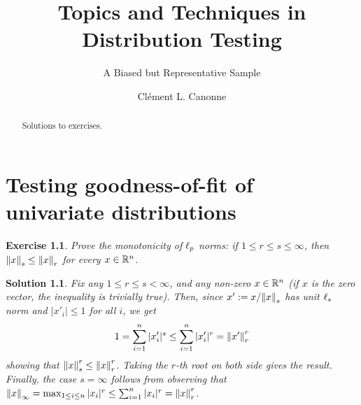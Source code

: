 \documentclass[biber]{nowfnt} %
\title{Topics and Techniques in Distribution Testing}
\subtitle{A Biased but Representative Sample}
\author[1]{Cl\'ement L. Canonne}
\affil[1]{University of Sydney; clement.canonne@sydney.edu.au}
\newtheorem{question}{Exercise}[chapter]
\newtheorem{solution}{Solution}[chapter]
\begin{document}
\makeabstracttitle
\begin{abstract}
Solutions to exercises.
\end{abstract}

\setcounter{chapter}{1}
\chapter{Testing goodness-of-fit of univariate distributions}
  \label{chap:identity}
  
  
 \begin{question}\label{ex:identity:monotonicity:lp}
  Prove the monotonicity of $\lp[p]$ norms: if $1\leq r\leq s \leq \infty$, then $\norm{x}_s \leq \norm{x}_r$ for every $x\in \R^n$.
\end{question}
\begin{solution}
Fix any $1\leq r\leq s < \infty$, and any non-zero $x\in\R^n$ (if $x$ is the zero vector, the inequality is trivially true). Then, since $x' \eqdef x/\norm{x}_s$ has unit $\lp[s]$ norm and $|x'_i| \leq 1$ for all $i$, we get
\[
	1 = \sum_{i=1}^n |x'_i|^s \leq \sum_{i=1}^n |x'_i|^r = \norm{x'}_r^r
\]
showing that $\norm{x}_s^r \leq \norm{x}_r^r$. Taking the $r$-th root on both side gives the result. Finally, the case $s=\infty$ follows from observing that $\norminf{x} = \max_{1\leq i\leq n} |x_i|^r \leq \sum_{i=1}^n |x_i|^r = \norm{x}_r^r$. 
\end{solution}
\end{document}
